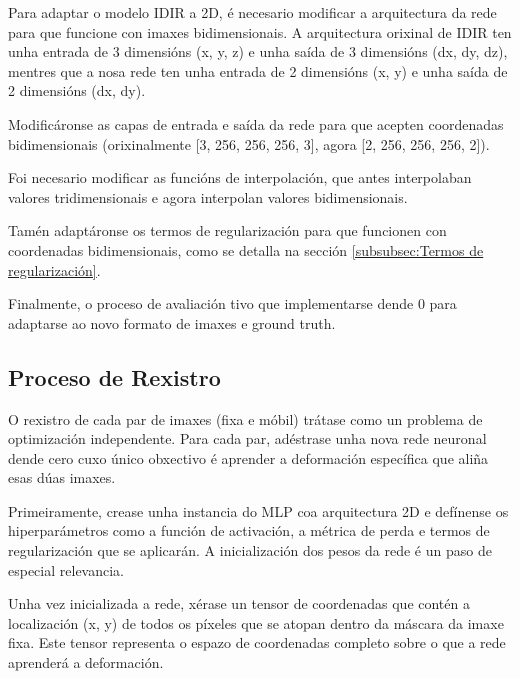 Para adaptar o modelo IDIR a 2D, é necesario modificar a arquitectura da rede para que funcione con imaxes bidimensionais.
A arquitectura orixinal de IDIR ten unha entrada de 3 dimensións (x, y, z) e unha saída de 3 dimensións (dx, dy, dz),
mentres que a nosa rede ten unha entrada de 2 dimensións (x, y) e unha saída de 2 dimensións (dx, dy).

Modificáronse as capas de entrada e saída da rede para que acepten coordenadas bidimensionais (orixinalmente [3, 256, 256, 256, 3], agora [2, 256, 256, 256, 2]).

Foi necesario modificar as funcións de interpolación, que antes interpolaban valores tridimensionais e agora interpolan valores bidimensionais.

Tamén adaptáronse os termos de regularización para que funcionen con coordenadas bidimensionais, como se detalla na sección \ref{subsubsec:Termos de regularización}.

Finalmente, o proceso de avaliación tivo que implementarse dende 0 para adaptarse ao novo formato de imaxes e ground truth.

\subsection{Proceso de Rexistro}
\label{subsec:Proceso de Rexistro}

O rexistro de cada par de imaxes (fixa e móbil) trátase como un problema de optimización independente. Para cada par, adéstrase unha nova rede neuronal dende cero cuxo único obxectivo é aprender a deformación específica que aliña esas dúas imaxes.

Primeiramente, crease unha instancia do MLP coa arquitectura 2D e defínense os hiperparámetros como a función de activación, a métrica de perda e termos de regularización que se aplicarán. A inicialización dos pesos da rede é un paso de especial relevancia. 

Unha vez inicializada a rede, xérase un tensor de coordenadas que contén a localización (x, y) de todos os píxeles que se atopan dentro da máscara da imaxe fixa. Este tensor representa o espazo de coordenadas completo sobre o que a rede aprenderá a deformación.

